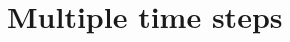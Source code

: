 \documentclass[a4paper,10pt]{article}
\begin{document}
% 
% 
% 
% 
% 
% 
% 
% 
% 
% 
% 
% 

\section{Multiple time steps}
\end{document}
